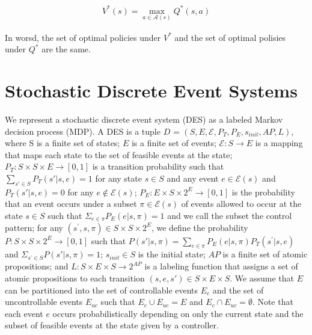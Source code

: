 \documentclass[a4j,12pt,oneside,openany,english,dvipdfmx]{jsbook}
\begin{document}
\begin{align*}
  V^{\ast}(s) = \max_{a \in \mathcal{A}(s)} Q^{\ast}(s,a)
\end{align*}

In worsd, the set of optimal policies under $V^{\ast}$ and the set of optimal polisies under $Q^{\ast}$ are the same.

\section{Stochastic Discrete Event Systems}

\begin{definition}
We represent a stochastic discrete event system (DES) as a labeled Markov decision process (MDP). A DES is a tuple $D$ = $(S, E, \mathcal{E}, P_T, P_E, s_{init}, AP, L)$, where S is a finite set of states; $E$ is a finite set of events; $\mathcal{E} : S \rightarrow E$ is a mapping that maps each state to the set of feasible events at the state; $P_T:S \times S \times E \rightarrow [0,1]$ is a transition probability such that $\sum_{s' \in S} P_T(s'|s,e) = 1$ for any state $s \in S$ and any event $e \in \mathcal{E}(s) $ and $P_T(s'|s,e) = 0$ for any $e \notin \mathcal{E}(s)$; $P_E : E \times S \times 2^E \rightarrow [0,1]$ is the probability that an event occurs under a subset $\pi \in \mathcal{E}(s)$ of events allowed to occur at the state $s \in S$ such that $\Sigma_{e \in \pi} P_E(e|s,\pi) = 1$ and we call the subset the control pattern; for any $(s^{\prime}, s, \pi) \in S \times S \times 2^E$, we define the probability $P : S \times S \times 2^{E} \rightarrow [0,1]$ such that $P(s'|s,\pi) = \sum_{e \in \pi}P_E(e|s,\pi) P_T(s^{\prime}|s,e)$ and $\Sigma_{s^{\prime} \in S} P(s'|s,\pi) = 1$; $s_{init} \in S$ is the initial state; $AP$ is a finite set of atomic propositions; and $L : S \times E \times S \rightarrow 2^{AP}$ is a labeling function that assigns a set of atomic propositions to each transition $(s, e, s') \in S \times E \times S$. We assume that $E$ can be partitioned into the set of controllable events $E_c$ and the set of uncontrollable events $E_{uc}$ such that $E_c \cup E_{uc} = E$ and $E_c \cap E_{uc} = \emptyset$. Note that each event $e$ occurs probabilistically depending on only the current state and the subset of feasible events at the state given by a controller.




\end{definition}
\end{document}
